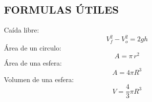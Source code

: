 \documentclass[letter,oneside,10pt]{article}
\begin{document}
\begin{multicols}{3}

\scriptsize
\section*{FORMULAS ÚTILES}
\vspace{-0.3cm}
Caída libre:
\vspace{-0.3cm}
\begin{equation*}
    V_f^2 - V_o^2 = 2gh
\end{equation*}
Área de un circulo:
\vspace{-0.3cm}
\begin{equation*}
    A = \pi\,r^2
\end{equation*}
Área de una esfera:
\vspace{-0.3cm}
\begin{equation*}
    A = 4\pi R^3
\end{equation*}
Volumen de una esfera:
\vspace{-0.3cm}
\begin{equation*}
    V = \frac{4}{3}\pi R^3
\end{equation*}

\vspace{-0.5cm}

\end{multicols}
\end{document}
